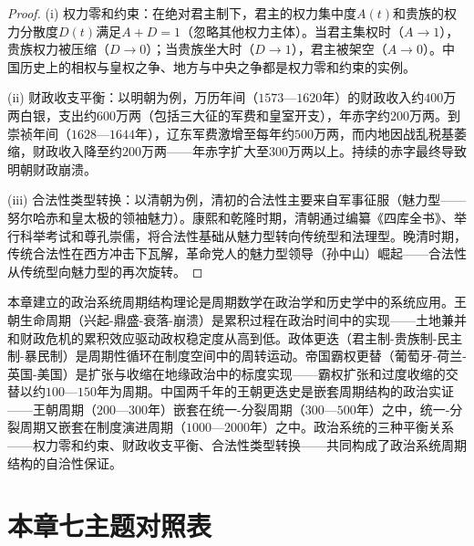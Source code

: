 \begin{proof}
(i) 权力零和约束：在绝对君主制下，君主的权力集中度$A(t)$和贵族的权力分散度$D(t)$满足$A + D = 1$（忽略其他权力主体）。当君主集权时（$A \to 1$），贵族权力被压缩（$D \to 0$）；当贵族坐大时（$D \to 1$），君主被架空（$A \to 0$）。中国历史上的相权与皇权之争、地方与中央之争都是权力零和约束的实例。

(ii) 财政收支平衡：以明朝为例，万历年间（$1573$—$1620$年）的财政收入约$400$万两白银，支出约$600$万两（包括三大征的军费和皇室开支），年赤字约$200$万两。到崇祯年间（$1628$—$1644$年），辽东军费激增至每年约$500$万两，而内地因战乱税基萎缩，财政收入降至约$200$万两——年赤字扩大至$300$万两以上。持续的赤字最终导致明朝财政崩溃。

(iii) 合法性类型转换：以清朝为例，清初的合法性主要来自军事征服（魅力型——努尔哈赤和皇太极的领袖魅力）。康熙和乾隆时期，清朝通过编纂《四库全书》、举行科举考试和尊孔崇儒，将合法性基础从魅力型转向传统型和法理型。晚清时期，传统合法性在西方冲击下瓦解，革命党人的魅力型领导（孙中山）崛起——合法性从传统型向魅力型的再次旋转。
\end{proof}

\begin{remark}[与全书的统一]
本章建立的政治系统周期结构理论是周期数学在政治学和历史学中的系统应用。王朝生命周期（兴起-鼎盛-衰落-崩溃）是累积过程在政治时间中的实现——土地兼并和财政危机的累积效应驱动政权稳定度从高到低。政体更迭（君主制-贵族制-民主制-暴民制）是周期性循环在制度空间中的周转运动。帝国霸权更替（葡萄牙-荷兰-英国-美国）是扩张与收缩在地缘政治中的标度实现——霸权扩张和过度收缩的交替以约$100$—$150$年为周期。中国两千年的王朝更迭史是嵌套周期结构的政治实证——王朝周期（$200$—$300$年）嵌套在统一-分裂周期（$300$—$500$年）之中，统一-分裂周期又嵌套在制度演进周期（$1000$—$2000$年）之中。政治系统的三种平衡关系——权力零和约束、财政收支平衡、合法性类型转换——共同构成了政治系统周期结构的自洽性保证。
\end{remark}

\section*{本章七主题对照表}

